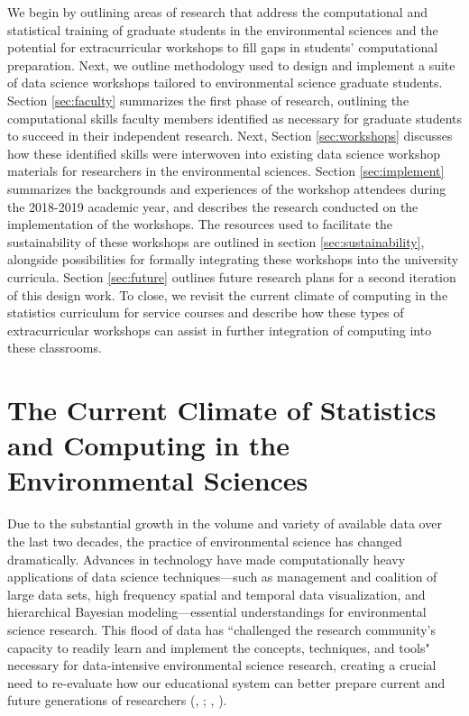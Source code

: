 \documentclass[12pt]{article}
\begin{document}
\quad We begin by outlining areas of research that address the computational and
statistical training of graduate students in the environmental sciences and the 
potential for extracurricular workshops to fill gaps in students' computational 
preparation. Next, we outline methodology used to design and implement a suite
of data science workshops tailored to environmental science graduate students. 
Section \ref{sec:faculty} summarizes the first phase of research, outlining the
computational skills faculty members identified as necessary for graduate
students to succeed in their independent research. Next, Section 
\ref{sec:workshops} discusses how these identified skills were interwoven into
existing data science workshop materials for researchers in the environmental
sciences. Section \ref{sec:implement} summarizes the backgrounds and experiences
of the workshop attendees during the 2018-2019 academic year, and describes the
research conducted on the implementation of the workshops. The resources used to 
facilitate the sustainability of these workshops are outlined in section 
\ref{sec:sustainability}, alongside possibilities for formally integrating these
workshops into the university curricula. Section \ref{sec:future} outlines
future research plans for a second iteration of this design work. To close, we
revisit the current climate of computing in the statistics curriculum for
service courses and describe how these types of extracurricular workshops can
assist in further integration of computing into these classrooms. 

\section{The Current Climate of Statistics and Computing in the Environmental 
Sciences}
\label{sec:lit}

\quad Due to the substantial growth in the volume and variety of available data 
over the last two decades, the practice of environmental science has changed 
dramatically. Advances in technology have made computationally heavy 
applications of data science techniques---such as management and coalition of 
large data sets, high frequency spatial and temporal data visualization, and 
hierarchical Bayesian modeling---essential understandings for environmental 
science research. This flood of data has ``challenged the research community's 
capacity to readily learn and implement the concepts, techniques, and tools" 
\citep[p.\ 546]{hampton} necessary for data-intensive environmental science 
research, creating a crucial need to re-evaluate how our educational system can
better prepare current and future generations of researchers 
(\citeauthor{green}, \citeyear{green}; \citeauthor{hampton}, 
\citeyear{hampton}).  
\end{document}
